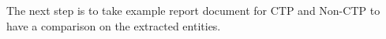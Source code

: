 The next step is to take example report document for CTP and Non-CTP to have a comparison on the extracted entities.  








































%

